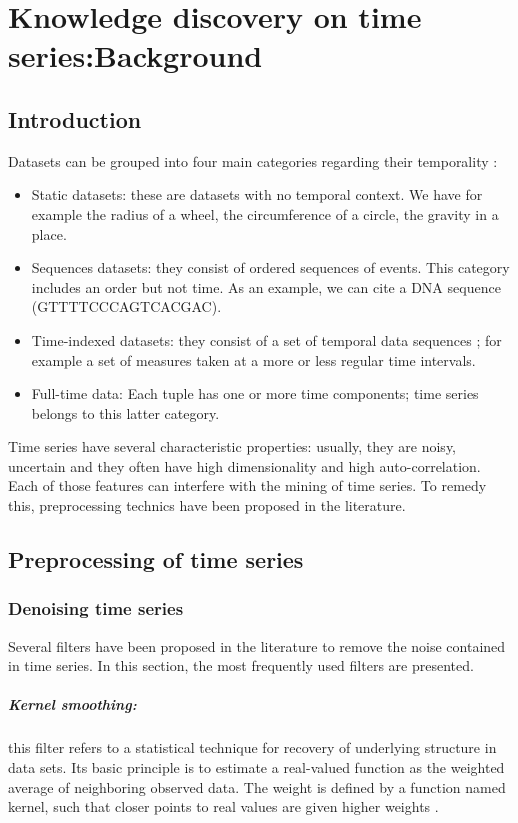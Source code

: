\chapter[Knowledge discovery on time series]{Knowledge discovery on time series:Background}
\label{kdd}

\section{Introduction}

Datasets can be grouped into four main categories regarding their temporality \cite{roddick2002survey}: 
\begin{itemize}
\item Static datasets: these are datasets with no temporal context. We have for example the radius of a wheel, the circumference of a circle, the gravity in a place.
\item Sequences datasets: they consist of   ordered sequences of events. This category includes an order but not time. As an example, we can cite a DNA sequence (GTTTTCCCAGTCACGAC).
\item Time-indexed datasets: they consist of a set of temporal data sequences ; for example a set of measures taken at a more or less regular time intervals.
\item Full-time data: Each tuple has one or more time components; time series belongs to this latter category.
\end{itemize}

Time series have several characteristic properties: usually, they are noisy, uncertain and  
they often have high dimensionality and high auto-correlation. Each of those features can interfere with the mining of time series.  To remedy this, preprocessing technics have been proposed in the literature.
\section{Preprocessing of time series}


\subsection{Denoising time series}
Several filters have been proposed in the literature to remove the noise contained in time series. In this section, the most  frequently used filters are presented.
\paragraph{Kernel smoothing:} this filter refers to a statistical technique for recovery of underlying structure in data sets. Its basic principle is to estimate a real-valued function as the weighted average of neighboring observed data. The weight is defined by a function named kernel, such that closer points to real values are given higher weights \cite{wand1994kernel}.

